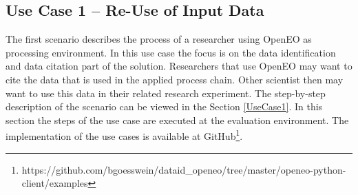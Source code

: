 \documentclass[draft,final]{vutinfth} %
\begin{document}
\subsection{Use Case 1 – Re-Use of Input Data}\label{Implementation:Use Case1}
The first scenario describes the process of a researcher using OpenEO as processing environment. In this use case the focus is on the data identification and data citation part of the solution. Researchers that use OpenEO may want to cite the data that is used in the applied process chain. Other scientist then may want to use this data in their related research experiment. The step-by-step description of the scenario can be viewed in the Section \ref{UseCase1}. In this section the steps of the use case are executed at the evaluation environment. The implementation of the use cases is available at GitHub\footnote{https://github.com/bgoesswein/dataid\_openeo/tree/master/openeo-python-client/examples}.
\end{document}
